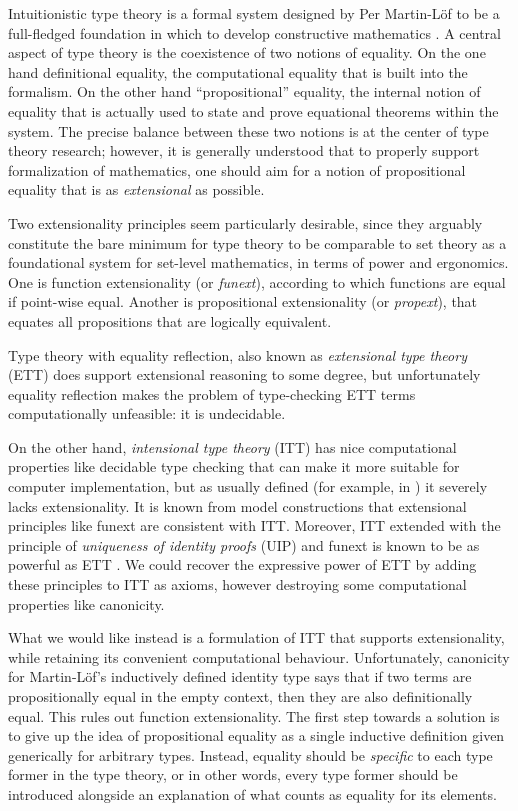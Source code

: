 \documentclass[autoref]{llncs}
\begin{document}
Intuitionistic type theory is a formal system designed by Per Martin-L\"of to be
a full-fledged foundation in which to develop constructive mathematics
\cite{mltt75,libretto}.
%
A central aspect of type theory is the coexistence of two notions of
equality. On the one hand definitional equality, the computational equality that
is built into the formalism. On the other hand ``propositional'' equality, the
internal notion of equality that is actually used to state and prove equational
theorems within the system. The precise balance between these two notions is at
the center of type theory research; however, it is generally understood that to
properly support formalization of mathematics, one should aim for a notion of
propositional equality that is as \emph{extensional} as possible.

Two extensionality principles seem particularly desirable, since they arguably
constitute the bare minimum for type theory to be comparable to set theory as a
foundational system for set-level mathematics, in terms of power and ergonomics.
One is function extensionality (or \emph{funext}), according to which functions
are equal if point-wise equal. Another is propositional extensionality
(or \emph{propext}), that equates all propositions that are logically equivalent.

Type theory with equality reflection, also known as \emph{extensional type
  theory} (ETT) does support extensional reasoning to some degree, but
unfortunately equality reflection makes the problem of type-checking ETT terms
computationally unfeasible: it is undecidable.

On the other hand, \emph{intensional type theory} (ITT) has nice computational
properties like decidable type checking that can make it more suitable for
computer implementation, but as usually defined (for example, in \cite{mltt75})
it severely lacks extensionality.
%
It is known from model constructions that extensional principles like funext are
consistent with ITT.
%
Moreover, ITT extended with the principle of \emph{uniqueness of identity
  proofs} (UIP) and funext is known to be as powerful as ETT
\cite{conservativity}. We could recover the expressive power of ETT by adding
these principles to ITT as axioms, however destroying some computational
properties like canonicity.

What we would like instead is a formulation of ITT that supports extensionality,
while retaining its convenient computational behaviour.
%
Unfortunately, canonicity for Martin-L{\"o}f's inductively defined
identity type says that if two terms are propositionally equal in the
empty context, then they are also definitionally equal. This rules out
function extensionality.
%
The first step towards a solution is to give up the idea of propositional
equality as a single inductive definition given generically for arbitrary
types. Instead, equality should be \emph{specific} to each type former in the
type theory, or in other words, every type former should be introduced alongside
an explanation of what counts as equality for its elements.
\end{document}
